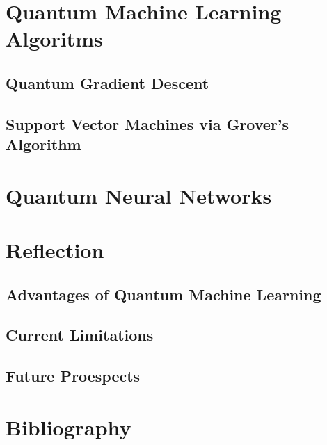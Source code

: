\documentclass[hidelinks,12pt]{article}
\begin{document}
\newpage
\section{Quantum Machine Learning Algoritms}
\subsection{Quantum Gradient Descent}
\subsection{Support Vector Machines via Grover's Algorithm}
\newpage
\section{Quantum Neural Networks}
\newpage
\section{Reflection}
\subsection{Advantages of Quantum Machine Learning}
\subsection{Current Limitations}
\subsection{Future Proespects}
\newpage
\section{Bibliography}
\end{document}
